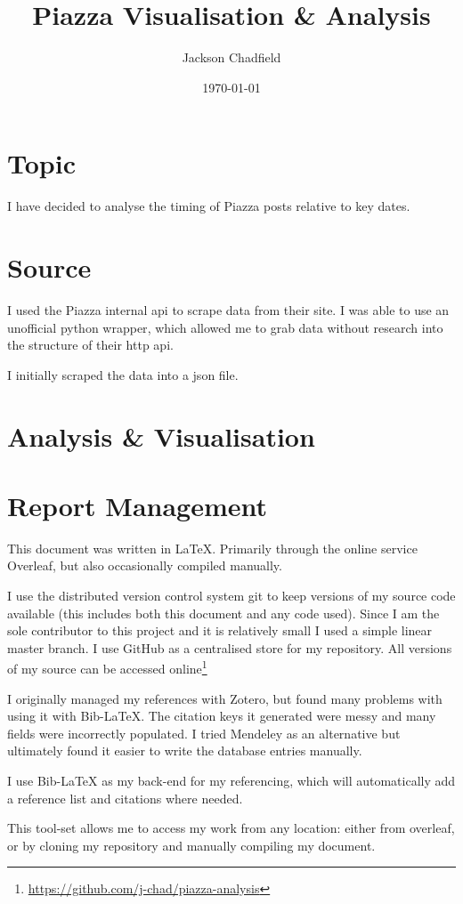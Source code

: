\documentclass{scrartcl}
\title{Piazza Visualisation \& Analysis}
\author{Jackson Chadfield}
\date{\today}
\begin{document}
\maketitle

\section{Topic}
I have decided to analyse the timing of Piazza posts relative to key dates.

\section{Source}
I used the Piazza internal \acrshort{api} to scrape data from their site. I was able to use an unofficial python wrapper\cite{piazza-api}, which allowed me to grab data without research into the structure of their \acrshort{http} \acrshort{api}.

I initially scraped the data into a \acrshort{json} file.

\section{Analysis \& Visualisation}

\section{Report Management}
This document was written in \LaTeX. Primarily through the online service Overleaf, but also occasionally compiled manually.

I use the distributed version control system git to keep versions of my source code available (this includes both this document and any code used). Since I am the sole contributor to this project and it is relatively small I used a simple linear master branch. I use GitHub as a centralised store for my repository. All versions of my source can be accessed online\footnote{\url{https://github.com/j-chad/piazza-analysis}}

I originally managed my references with Zotero, but found many problems with using it with Bib-\LaTeX{}. The citation keys it generated were messy and many fields were incorrectly populated. I tried Mendeley as an alternative but ultimately found it easier to write the database entries manually.

I use Bib-\LaTeX{} as my back-end for my referencing, which will automatically add a reference list and citations where needed.

This tool-set allows me to access my work from any location: either from overleaf, or by cloning my repository and manually compiling my document.

\printnoidxglossary[type=\acronymtype]
\printbibliography
\end{document}
